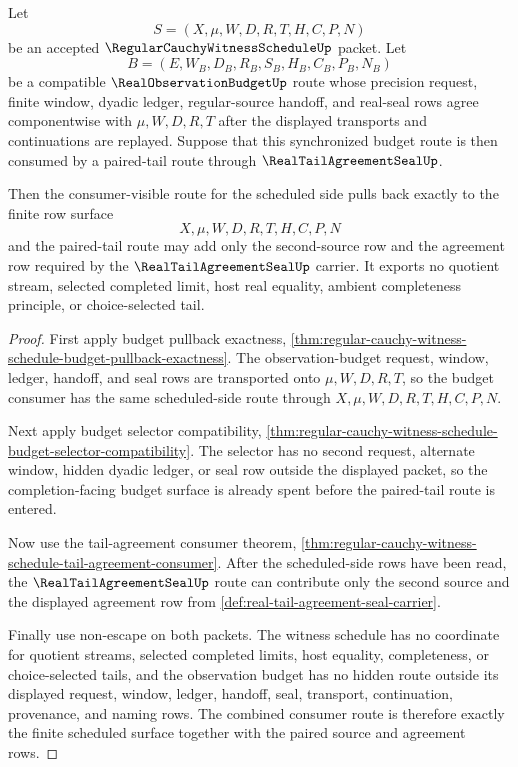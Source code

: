 \begin{theorem}
\label{thm:regular-cauchy-witness-schedule-budget-tail-agreement-pullback}
Let
$$
S=(X,\mu,W,D,R,T,H,C,P,N)
$$
be an accepted $\RegularCauchyWitnessScheduleUp$ packet. Let
$$
B=(E,W_B,D_B,R_B,S_B,H_B,C_B,P_B,N_B)
$$
be a compatible $\RealObservationBudgetUp$ route whose precision request, finite window, dyadic ledger, regular-source handoff, and real-seal rows agree componentwise with $\mu,W,D,R,T$ after the displayed transports and continuations are replayed. Suppose that this synchronized budget route is then consumed by a paired-tail route through $\RealTailAgreementSealUp$.

Then the consumer-visible route for the scheduled side pulls back exactly to the finite row surface
$$
X,\mu,W,D,R,T,H,C,P,N
$$
and the paired-tail route may add only the second-source row and the agreement row required by the $\RealTailAgreementSealUp$ carrier. It exports no quotient stream, selected completed limit, host real equality, ambient completeness principle, or choice-selected tail.
\end{theorem}
\begin{proof}
First apply budget pullback exactness, \autoref{thm:regular-cauchy-witness-schedule-budget-pullback-exactness}. The observation-budget request, window, ledger, handoff, and seal rows are transported onto $\mu,W,D,R,T$, so the budget consumer has the same scheduled-side route through $X,\mu,W,D,R,T,H,C,P,N$.

Next apply budget selector compatibility, \autoref{thm:regular-cauchy-witness-schedule-budget-selector-compatibility}. The selector has no second request, alternate window, hidden dyadic ledger, or seal row outside the displayed packet, so the completion-facing budget surface is already spent before the paired-tail route is entered.

Now use the tail-agreement consumer theorem, \autoref{thm:regular-cauchy-witness-schedule-tail-agreement-consumer}. After the scheduled-side rows have been read, the $\RealTailAgreementSealUp$ route can contribute only the second source and the displayed agreement row from \autoref{def:real-tail-agreement-seal-carrier}.

Finally use non-escape on both packets. The witness schedule has no coordinate for quotient streams, selected completed limits, host equality, completeness, or choice-selected tails, and the observation budget has no hidden route outside its displayed request, window, ledger, handoff, seal, transport, continuation, provenance, and naming rows. The combined consumer route is therefore exactly the finite scheduled surface together with the paired source and agreement rows.
\end{proof}

